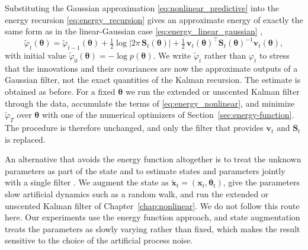 Substituting the Gaussian approximation \eqref{eq:nonlinear_predictive} into the energy recursion \eqref{eq:energy_recursion} gives an approximate energy of exactly the same form as in the linear-Gaussian case \eqref{eq:energy_linear_gaussian} \cite[Section~12.3.3]{sarkka:bayesian_filtering},
\begin{equation}\label{eq:energy_nonlinear}
    \tilde{\varphi}_t(\boldsymbol{\theta}) = \tilde{\varphi}_{t-1}(\boldsymbol{\theta}) + \tfrac{1}{2}\log\bigl|2\pi\,\mathbf{S}_t(\boldsymbol{\theta})\bigr| + \tfrac{1}{2}\,\mathbf{v}_t(\boldsymbol{\theta})^\top \mathbf{S}_t(\boldsymbol{\theta})^{-1} \mathbf{v}_t(\boldsymbol{\theta}),
\end{equation}
with initial value $\tilde{\varphi}_0(\boldsymbol{\theta}) = -\log p(\boldsymbol{\theta})$. We write $\tilde{\varphi}_t$ rather than $\varphi_t$ to stress that the innovations and their covariances are now the approximate outputs of a Gaussian filter, not the exact quantities of the Kalman recursion. The estimate is obtained as before. For a fixed $\boldsymbol{\theta}$ we run the extended or unscented Kalman filter through the data, accumulate the terms of \eqref{eq:energy_nonlinear}, and minimize $\tilde{\varphi}_T$ over $\boldsymbol{\theta}$ with one of the numerical optimizers of Section~\ref{sec:energy-function}. The procedure is therefore unchanged, and only the filter that provides $\mathbf{v}_t$ and $\mathbf{S}_t$ is replaced.

\begin{remark}\label{rem:state_augmentation}
An alternative that avoids the energy function altogether is to treat the unknown parameters as part of the state and to estimate states and parameters jointly with a single filter \cite[Section~12.3.1]{sarkka:bayesian_filtering}. We augment the state as $\tilde{\mathbf{x}}_t = (\mathbf{x}_t, \boldsymbol{\theta}_t)$, give the parameters slow artificial dynamics such as a random walk, and run the extended or unscented Kalman filter of Chapter~\ref{chap:nonlinear}. We do not follow this route here. Our experiments use the energy function approach, and state augmentation treats the parameters as slowly varying rather than fixed, which makes the result sensitive to the choice of the artificial process noise.
\end{remark}

